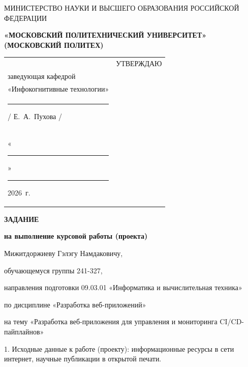 \documentclass[14pt, a4paper]{extarticle}
\begin{document}
\pagestyle{empty}


\begin{center}
    {\small МИНИСТЕРСТВО НАУКИ И ВЫСШЕГО ОБРАЗОВАНИЯ РОССИЙСКОЙ ФЕДЕРАЦИИ}


    {\small \textbf{«МОСКОВСКИЙ ПОЛИТЕХНИЧЕСКИЙ УНИВЕРСИТЕТ»}} \\
    {\small \textbf{(МОСКОВСКИЙ ПОЛИТЕХ)}}
\end{center}

\begin{tabularx}{\textwidth}{@{} p{} p{} @{}}
     &
    \raggedright
    УТВЕРЖДАЮ                          \\
    заведующая кафедрой                \\
    «Инфокогнитивные технологии»       \\[0.3cm]

    \rule{3cm}{0.4pt} / Е.~А.~Пухова / \\[0.1cm]

    «\rule{0.8cm}{0.4pt}» \rule{3cm}{0.4pt} 2026~г.
\end{tabularx}


\begin{center}

    { \large \textbf{ЗАДАНИЕ}}

    \textbf{на выполнение курсовой работы (проекта)}

    Мижитдоржиеву Гэлэгу Намдаковичу, %

\end{center}

обучающемуся группы 241-327,

направления подготовки 09.03.01 «Информатика и вычислительная техника»

по дисциплине «Разработка веб-приложений»

на тему «Разработка веб-приложения для управления и мониторинга CI/CD-пайплайнов»

1. Исходные данные к работе (проекту): информационные ресурсы в сети
интернет, научные публикации в открытой печати.
\end{document}
